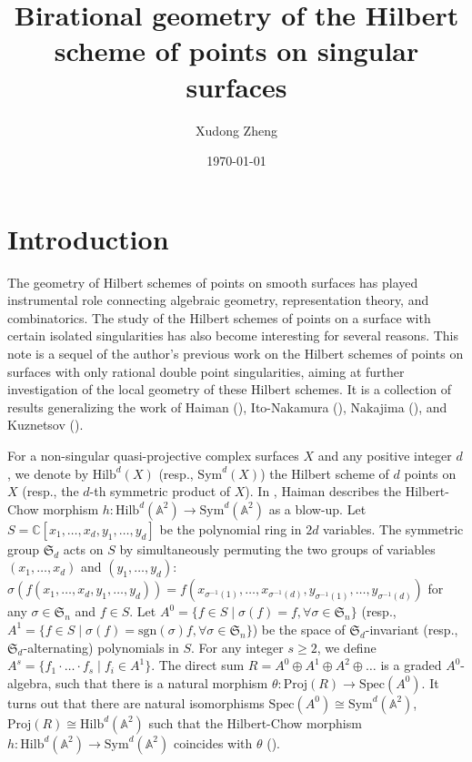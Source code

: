 \documentclass{amsart}[12pt]
\theoremstyle{definition}
\theoremstyle{remark}
\numberwithin{equation}{section}
\begin{document}
\title[Birational geometry of the Hilbert scheme of points]{ Birational geometry of the Hilbert scheme of points on singular surfaces}%
\author{Xudong Zheng}%
\address{Johns Hopkins University, 3400 N. Charles St. Baltimore, MD 21218 USA}%
%

\maketitle
\date{\today}%

\section{Introduction}
The geometry of Hilbert schemes of points on smooth surfaces has played instrumental role connecting algebraic geometry, representation theory, and combinatorics. The study of the Hilbert schemes of points on a surface with certain isolated singularities has also become interesting for several reasons. This note is a sequel of the author's previous work on the Hilbert schemes of points on surfaces with only rational double point singularities, aiming at further investigation of the local geometry of these Hilbert schemes. It is a collection of results generalizing the work of Haiman (\cite{H98, H01}), Ito-Nakamura (\cite{IN99}), Nakajima (\cite{N94, N98}), and Kuznetsov (\cite{K07}).

For a non-singular quasi-projective complex surfaces $X$ and any positive integer $d$, we denote by $\mathrm{Hilb}^d(X)$ (resp., $\mathrm{Sym}^d(X)$) the Hilbert scheme of $d$ points on $X$ (resp., the $d$-th symmetric product of $X$). In \cite[Proposition 2.6]{H98}, Haiman describes the Hilbert-Chow morphism $h: \mathrm{Hilb}^d(\mathbb{A}^2) \to \mathrm{Sym}^d(\mathbb{A}^2)$ as a blow-up. Let $S = \mathbb{C}[x_1, \dots, x_d, y_1, \dots, y_d]$ be the polynomial ring in $2d$ variables. The symmetric group $\mathfrak{S}_d$ acts on $S$ by simultaneously permuting the two groups of variables $(x_1, \dots, x_d)$ and $(y_1, \dots, y_d)$: $\sigma(f(x_1, \dots, x_d, y_1, \dots, y_d)) = f(x_{\sigma^{-1}(1)}, \dots, x_{\sigma^{-1}(d)}, y_{\sigma^{-1}(1)}, \dots, y_{\sigma^{-1}(d)})$ for any $\sigma \in \mathfrak{S}_n$ and $f \in S$. Let $A^0 = \{f \in S \mid \sigma (f) = f, \forall \sigma \in \mathfrak{S}_n\}$ (resp., $A^1 = \{f \in S \mid \sigma (f) = \mathrm{sgn}(\sigma) f, \forall \sigma \in \mathfrak{S}_n\}$) be the space of $\mathfrak{S}_d$-invariant (resp., $\mathfrak{S}_d$-alternating) polynomials in $S$. For any integer $s \geq 2$, we define $A^s = \{f_1\cdot \dots \cdot f_s \mid f_i \in A^1\}$. The direct sum $R = A^0 \oplus A^1 \oplus A^2 \oplus \dots$ is a graded $A^0$-algebra, such that there is a natural morphism $\theta: \mathrm{Proj}(R) \to \mathrm{Spec}(A^0)$. It turns out that there are natural isomorphisms $\mathrm{Spec}(A^0) \cong \mathrm{Sym}^d(\mathbb{A}^2)$, $\mathrm{Proj}(R) \cong \mathrm{Hilb}^d(\mathbb{A}^2)$ such that the Hilbert-Chow morphism $h: \mathrm{Hilb}^d(\mathbb{A}^2) \to \mathrm{Sym}^d(\mathbb{A}^2)$ coincides with $\theta$ (\cite[Proposition 2.6]{H98}).
\end{document}
